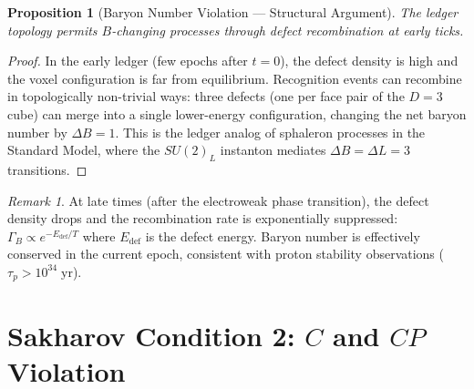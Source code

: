 \documentclass[12pt,a4paper]{article}
\newtheorem{proposition}[theorem]{Proposition}
\theoremstyle{definition}
\theoremstyle{remark}
\newtheorem{remark}[theorem]{Remark}
\begin{document}
\begin{proposition}[Baryon Number Violation --- Structural Argument]
\label{thm:b-violation}
The ledger topology permits $B$-changing processes through defect
recombination at early ticks.
\end{proposition}

\begin{proof}
In the early ledger (few epochs after $t = 0$), the defect density
is high and the voxel configuration is far from equilibrium.
Recognition events can recombine in topologically non-trivial ways:
three defects (one per face pair of the $D = 3$ cube) can merge
into a single lower-energy configuration, changing the net baryon
number by $\Delta B = 1$.  This is the ledger analog of sphaleron
processes in the Standard Model, where the $SU(2)_L$ instanton
mediates $\Delta B = \Delta L = 3$ transitions.
\end{proof}

\begin{remark}
At late times (after the electroweak phase transition), the defect
density drops and the recombination rate is exponentially suppressed:
$\Gamma_B \propto e^{-E_{\mathrm{def}}/T}$ where $E_{\mathrm{def}}$
is the defect energy.  Baryon number is effectively conserved in the
current epoch, consistent with proton stability observations
($\tau_p > 10^{34}\;\mathrm{yr}$).
\end{remark}

\section{Sakharov Condition 2: $C$ and $CP$ Violation}
\label{sec:c-violation}
\label{sec:cp-violation}
\end{document}
